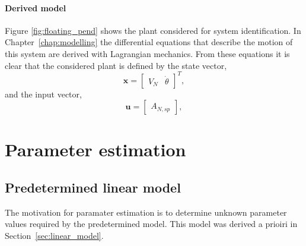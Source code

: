         \paragraph{Derived model}
        Figure \ref{fig:floating_pend} shows the plant considered for system identification.
        In Chapter~\ref{chap:modelling} the differential equations that describe the motion of this system are derived with Lagrangian mechanics.
        From these equations it is clear that the considered plant is defined by the state vector,
        \begin{equation}
            \bm{x} = \begin{bmatrix}
                V_N & \dot{\theta}
            \end{bmatrix}^T,
        \end{equation}
        and the input vector,
        \begin{equation}
            \bm{u} = \begin{bmatrix}
                A_{N,sp}
            \end{bmatrix},
        \end{equation}
    

\section{Parameter estimation}
    \subsection{Predetermined linear model}
        The motivation for paramater estimation is to determine unknown parameter values required by the predetermined model.
        This model was derived a prioiri in Section~\ref{sec:linear_model}.
        
